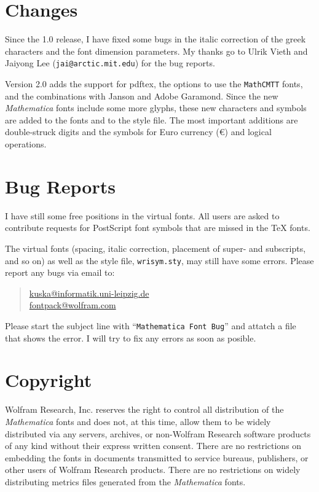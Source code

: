 \documentclass{article}
\newcommand{\Janson}[1]{{\fontfamily{pjn}\fontencoding{T1}%
\fontshape{n}\selectfont #1}}
\newcommand{\Garamond}[1]{{\fontfamily{pad}\fontencoding{T1}%
\fontshape{n}\selectfont #1}}
\newcommand{\cmtt}{\texttt{MathCMTT}\xspace}
\newcommand{\Math}{\textit{Mathematica}\xspace}
\begin{document}
\section{Changes}
Since the 1.0 release, I have fixed some bugs in the italic correction
of the greek characters and the font dimension parameters. My thanks
go to Ulrik Vieth and Jaiyong Lee (\verb|jai@arctic.mit.edu|) for the
bug reports.

Version 2.0 adds the support for \textsf{pdftex}, the options to use
the \cmtt fonts, and the combinations with \Janson{Janson} and
\Garamond{Adobe Garamond}. Since the new \Math{} fonts include some
more glyphs, these new characters and symbols are added to the fonts
and to the style file. The most important additions are double-struck
digits and the symbols for Euro currency (\euro) and logical
operations.


\section{Bug Reports}

I have still some free positions in the virtual fonts. All users are
asked to contribute requests for PostScript font symbols that are
missed in the \TeX{} fonts.

The virtual fonts (spacing, italic correction, placement of super- and
subscripts, and so on) as well as the style file, \texttt{wrisym.sty},
may still have some errors. Please report any bugs via email to:

\begin{quote}
\href{kuska@informatik.uni-leipzig.de}{kuska@informatik.uni-leipzig.de}\\
\href{fontpack@wolfram.com}{fontpack@wolfram.com}
\end{quote}

Please start the subject line with ``\verb|Mathematica Font Bug|'' and
attatch a \LaTeXe{} file that shows the error. I will try to fix any
errors as soon as posible.


\section{Copyright}


Wolfram Research, Inc. reserves the right to control all distribution
of the \Math fonts and does not, at this time, allow them to be
widely distributed via any servers, archives, or non-Wolfram Research
software products of any kind without their express written
consent. There are no restrictions on embedding the fonts in documents
transmitted to service bureaus, publishers, or other users of Wolfram
Research products. There are no restrictions on widely distributing
metrics files generated from the \Math{} fonts.
\end{document}
